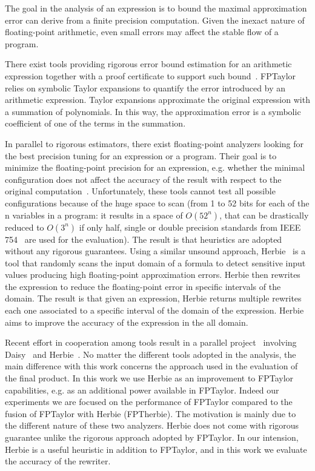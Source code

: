 \documentclass[runningheads]{llncs}
\begin{document}
The goal in the analysis of an expression is to bound the maximal approximation error can derive from a finite precision computation. Given the inexact nature of floating-point arithmetic, even small errors may affect the stable flow of a program.

There exist tools providing rigorous error bound estimation for an arithmetic expression together with a proof certificate to support such bound~\cite{fptaylor,magron,precisa,daisy}. FPTaylor~\cite{fptaylor} relies on symbolic Taylor expansions to quantify the error introduced by an arithmetic expression. Taylor expansions approximate the original expression with a summation of polynomials. In this way, the approximation error is a symbolic coefficient of one of the terms in the summation.

In parallel to rigorous estimators, there exist floating-point analyzers looking for the best precision tuning for an expression or a program. Their goal is to minimize the floating-point precision for an expression, e.g. whether the minimal configuration does not affect the accuracy of the result with respect to the original computation~\cite{mixedLam,herbgrind,precimonius}.
Unfortunately, these tools cannot test all possible configurations because of the huge space to scan (from 1 to 52 bits for each of the n variables in a program: it results in a space of $O(52^n)$, that can be drastically reduced to $O(3^n)$ if only half, single or double precision standards from IEEE 754~\cite{ieee} are used for the evaluation). 
The result is that heuristics are adopted without any rigorous guarantees.
Using a similar unsound approach, Herbie~\cite{herbie} is a tool that randomly scans the input domain of a formula to detect sensitive input values producing high floating-point approximation errors. Herbie then rewrites the expression to reduce the floating-point error in specific intervals of the domain. The result is that given an expression, Herbie returns multiple rewrites each one associated to a specific interval of the domain of the expression. Herbie aims to improve the accuracy of the expression in the all domain.

Recent effort in cooperation among  tools result in a parallel project~\cite{daisyherbie} involving Daisy~\cite{daisy} and Herbie~\cite{herbie}. No matter the different tools adopted in the analysis, the main difference with this work concerns the approach used in the evaluation of the final product. In this work we use Herbie as an improvement to FPTaylor capabilities, e.g. as an additional power available in FPTaylor. Indeed our experiments we are focused on the performance of FPTaylor compared to the fusion of FPTaylor with Herbie (FPTherbie). The motivation is mainly due to the different nature of these two analyzers. Herbie does not come with rigorous guarantee unlike the rigorous approach adopted by FPTaylor. In our intension, Herbie is a useful heuristic in addition to FPTaylor, and in this work we evaluate the accuracy of the rewriter.
\end{document}
